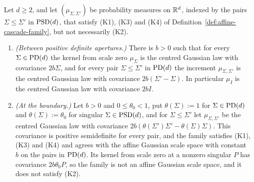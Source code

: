 \begin{proposition}\label{prop:affine-rigidity-boundary}
Let $d \ge 2$, and let $(\mu_{\Sigma,\Sigma'})$ be probability measures on $\mathbb{R}^d$, indexed by the pairs
$\Sigma \le \Sigma'$ in $\mathrm{PSD}(d)$, that satisfy (K1), (K3) and (K4) of Definition~\ref{def:affine-cascade-family}, but
not necessarily (K2).
\begin{enumerate}
\item \emph{(Between positive definite apertures.)} There is $b > 0$ such that for every $\Sigma \in \mathrm{PD}(d)$
the kernel from scale zero $\mu_\Sigma$ is the centred Gaussian law with covariance $2b\Sigma$, and for every
pair $\Sigma \le \Sigma'$ in $\mathrm{PD}(d)$ the increment $\mu_{\Sigma,\Sigma'}$ is the centred Gaussian law with
covariance $2b(\Sigma' - \Sigma)$. In particular $\mu_I$ is the centred Gaussian law with covariance $2bI$.
\item \emph{(At the boundary.)} Let $b > 0$ and $0 \le \theta_0 < 1$, put $\theta(\Sigma) := 1$ for
$\Sigma \in \mathrm{PD}(d)$ and $\theta(\Sigma) := \theta_0$ for singular $\Sigma \in \mathrm{PSD}(d)$, and for
$\Sigma \le \Sigma'$ let $\mu_{\Sigma,\Sigma'}$ be the centred Gaussian law with covariance
$2b(\theta(\Sigma')\Sigma' - \theta(\Sigma)\Sigma)$. This covariance is positive semidefinite for every pair,
and the family satisfies (K1), (K3) and (K4) and agrees with the affine Gaussian scale space with constant
$b$ on the pairs in $\mathrm{PD}(d)$. Its kernel from scale zero at a nonzero singular $P$ has covariance
$2b\theta_0P$, so the family is not an affine Gaussian scale space, and it does not satisfy (K2).
\end{enumerate}
\end{proposition}

